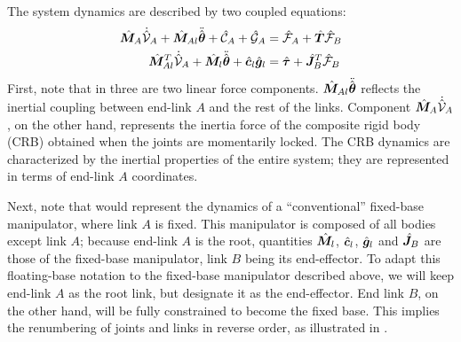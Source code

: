 The system dynamics are described by two coupled equations:
%
\begin{align}
  {\hat{\bm{M}}}_{A}\dot{\hat{\mathcal{V}}}_{A} + {\hat{\bm{M}}}_{Al}{\ddot{\hat{\bm{\theta}}}} + \hat{\mathcal{C}}_{A} + \hat{\mathcal{G}}_{A} &=
  \hat{\mathcal{F}}_{A} + {\hat{\bm{T}}}\hat{\mathcal{F}}_{B}\label{eq:EOM_MF_TASK}\\
  {\hat{\bm{M}}}_{Al}^{T}\dot{\hat{\mathcal{V}}}_{A} + {\hat{\bm{M}}}_{l}{\ddot{\hat{\bm{\theta}}}} + {\hat{\bm{c}}}_{l} {\hat{\bm{g}}}_{l} &=
  {\hat{\bm{\tau}}} + {\hat{\bm{J}}}_{B}^{T}\hat{\mathcal{F}}_{B}\label{eq:EOM_MF_JOINT}
\end{align}
%
First, note that in  three are two linear force components.
${\hat{\bm{M}}}_{Al}{\ddot{\hat{\bm{\theta}}}}$ reflects the inertial coupling between end-link $A$ and the rest of the links.
Component ${\hat{\bm{M}}}_{A}\dot{\hat{\mathcal{V}}}_{A}$, on the other hand,
represents the inertia force of the composite rigid body (CRB) obtained when the joints are momentarily locked.
The CRB dynamics are characterized by the inertial properties of the entire system;
they are represented in terms of end-link $A$ coordinates.

Next, note that  would represent the dynamics of a ``conventional'' fixed-base manipulator,
where link $A$ is fixed.
This manipulator is composed of all bodies except link $A$;
because end-link $A$ is the root, quantities ${\hat{\bm{M}}}_{l}$, ${\hat{\bm{c}}}_{l}$, ${\hat{\bm{g}}}_{l}$ and
${\hat{\bm{J}}}_{B}$ are those of the fixed-base manipulator, link $B$ being its end-effector.
To adapt this floating-base notation to the fixed-base manipulator described above,
we will keep end-link $A$ as the root link, but designate it as the end-effector.
End link $B$, on the other hand,
will be fully constrained to become the fixed base.
This implies the renumbering of joints and links in reverse order, as illustrated in .

